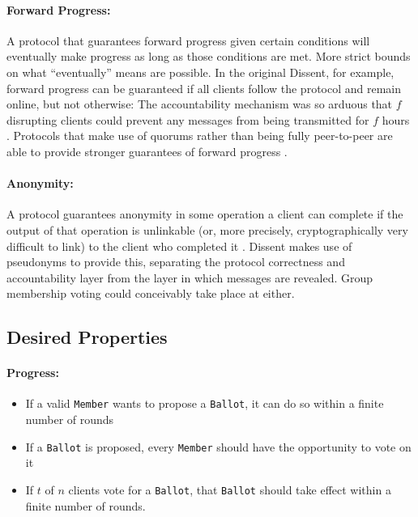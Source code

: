     \paragraph{Forward Progress:} A protocol that guarantees forward progress
    given certain conditions will eventually make progress as long as those
    conditions are met. More strict bounds on what ``eventually'' means are
    possible. In the original Dissent, for example, forward progress can be
    guaranteed if all clients follow the protocol and remain online, but not
    otherwise: The accountability mechanism was so arduous that $f$ disrupting
    clients could prevent any messages from being transmitted for $f$ hours
    \cite{corrigan-gibbs_proactively_2013}. Protocols that make use of quorums
    rather than being fully peer-to-peer are able to provide stronger guarantees
    of forward progress \cite{lamport_part-time_1998}.
    \paragraph{Anonymity:} A protocol guarantees anonymity in some operation a
    client can complete if the output of that operation is unlinkable (or, more
    precisely, cryptographically very difficult to link) to the client who
    completed it \cite{corrigan-gibbs_dissent:_2010}. Dissent makes use of
    pseudonyms to provide this, separating the protocol correctness and
    accountability layer from the layer in which messages are revealed. Group
    membership voting could conceivably take place at either.

\subsection{Desired Properties}
\paragraph{Progress:}
\begin{itemize}
  \item If a valid \texttt{Member} wants to propose a \texttt{Ballot}, it can
    do so within a finite number of rounds
  \item If a \texttt{Ballot} is proposed, every \texttt{Member} should have
    the opportunity to vote on it
  \item If $t$ of $n$ clients vote for a \texttt{Ballot}, that \texttt{Ballot}
    should take effect within a finite number of rounds.
\end{itemize}
